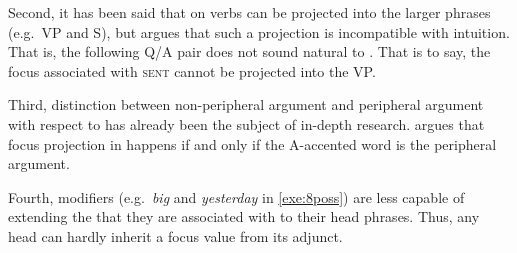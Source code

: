 
Second, it has been said that  on verbs can be projected
into the larger phrases (e.g.\ VP and S), but \citet{gussenhoven:99}
argues that such a projection is incompatible with intuition.  That
is, the following Q/A pair does not sound natural to
\citeauthor{gussenhoven:99}. That is to say, the focus associated with
\textsc{sent} cannot be projected into the VP.





Third, distinction between non-peripheral argument and peripheral
argument with respect to  has already been the
subject of in-depth research.  \citet{bresnan:71} argues that focus
projection in  happens if and only if the A-accented word
is the peripheral argument.




Fourth, modifiers (e.g.\ \textit{big} and \textit{yesterday} in
\ref{exe:8poss}) are less capable of extending the  that
they are associated with to their head phrases. Thus, any head can
hardly inherit a focus value from its adjunct.


